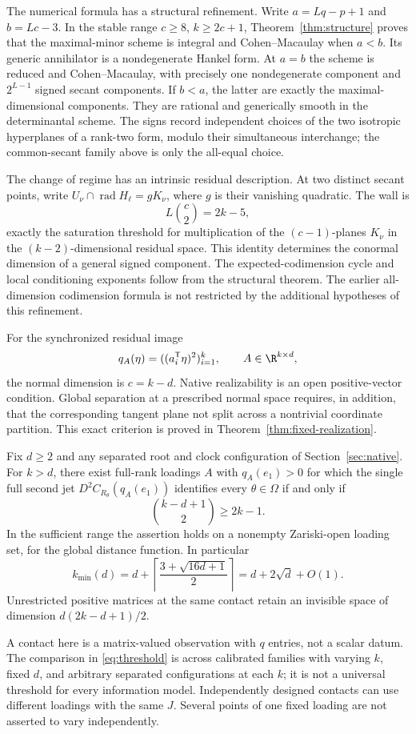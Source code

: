 The numerical formula has a structural refinement. Write $a=Lq-p+1$ and $b=Lc-3$. In the stable range $c\ge8$, $k\ge2c+1$, Theorem~\ref{thm:structure} proves that the maximal-minor scheme is integral and Cohen--Macaulay when $a<b$. Its generic annihilator is a nondegenerate Hankel form. At $a=b$ the scheme is reduced and Cohen--Macaulay, with precisely one nondegenerate component and $2^{L-1}$ signed secant components. If $b<a$, the latter are exactly the maximal-dimensional components. They are rational and generically smooth in the determinantal scheme. The signs record independent choices of the two isotropic hyperplanes of a rank-two form, modulo their simultaneous interchange; the common-secant family above is only the all-equal choice.

The change of regime has an intrinsic residual description. At two distinct secant points, write $U_\nu\cap\operatorname{rad}H_\ell=gK_\nu$, where $g$ is their vanishing quadratic. The wall is
\[
 L\binom{c}{2}=2k-5,
\]
exactly the saturation threshold for multiplication of the $(c-1)$-planes $K_\nu$ in the $(k-2)$-dimensional residual space. This identity determines the conormal dimension of a general signed component. The expected-codimension cycle and local conditioning exponents follow from the structural theorem. The earlier all-dimension codimension formula is not restricted by the additional hypotheses of this refinement.

For the synchronized residual image
\[
 q_A(\eta)=((a_i^{\mathsf T}\eta)^2)_{i=1}^k,\qquad A\in\R^{k\times d},
\]
the normal dimension is $c=k-d$. Native realizability is an open positive-vector condition. Global separation at a prescribed normal space requires, in addition, that the corresponding tangent plane not split across a nontrivial coordinate partition. This exact criterion is proved in Theorem~\ref{thm:fixed-realization}.
\begin{theorem}\label{thm:threshold}
Fix $d\ge2$ and any separated root and clock configuration of Section~\ref{sec:native}. For $k>d$, there exist full-rank loadings $A$ with $q_A(e_1)>0$ for which the single full second jet $D^2C_{R_\theta}(q_A(e_1))$ identifies every $\theta\in\Omega$ if and only if
\[
 \binom{k-d+1}{2}\ge2k-1.
\]
In the sufficient range the assertion holds on a nonempty Zariski-open loading set, for the global distance function. In particular
\begin{equation}\label{eq:threshold}
 k_{\min}(d)=d+\left\lceil\frac{3+\sqrt{16d+1}}2\right\rceil
            =d+2\sqrt d+O(1).
\end{equation}
Unrestricted positive matrices at the same contact retain an invisible space of dimension $d(2k-d+1)/2$.
\end{theorem}
A contact here is a matrix-valued observation with $q$ entries, not a scalar datum. The comparison in \eqref{eq:threshold} is across calibrated families with varying $k$, fixed $d$, and arbitrary separated configurations at each $k$; it is not a universal threshold for every information model. Independently designed contacts can use different loadings with the same $J$. Several points of one fixed loading are not asserted to vary independently.


